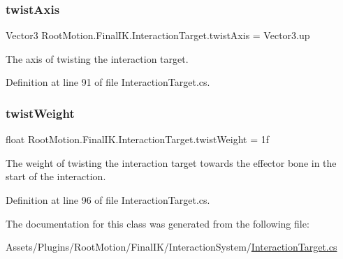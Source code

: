 \subsubsection{\texorpdfstring{twist\+Axis}{twistAxis}}
{\footnotesize\ttfamily Vector3 Root\+Motion.\+Final\+I\+K.\+Interaction\+Target.\+twist\+Axis = Vector3.\+up}



The axis of twisting the interaction target. 



Definition at line 91 of file Interaction\+Target.\+cs.

\mbox{\label{class_root_motion_1_1_final_i_k_1_1_interaction_target_a7e63518b5f31ba27e7356f6f7acc9f88}} 
\subsubsection{\texorpdfstring{twist\+Weight}{twistWeight}}
{\footnotesize\ttfamily float Root\+Motion.\+Final\+I\+K.\+Interaction\+Target.\+twist\+Weight = 1f}



The weight of twisting the interaction target towards the effector bone in the start of the interaction. 



Definition at line 96 of file Interaction\+Target.\+cs.



The documentation for this class was generated from the following file\+:\begin{DoxyCompactItemize}
\item 
Assets/\+Plugins/\+Root\+Motion/\+Final\+I\+K/\+Interaction\+System/\mbox{\hyperlink{_interaction_target_8cs}{Interaction\+Target.\+cs}}\end{DoxyCompactItemize}
